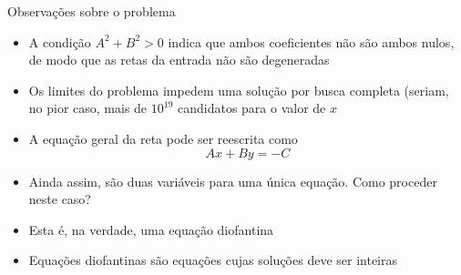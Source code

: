 \begin{frame}[fragile]{Observações sobre o problema}

    \begin{itemize}
        \item A condição $A^2 + B^2 > 0$ indica que ambos coeficientes não são ambos nulos,
            de modo que as retas da entrada não são degeneradas

        \item Os limites do problema impedem uma solução por busca completa (seriam, no pior 
            caso, mais de $10^{19}$ candidatos para o valor de $x$

        \item A equação geral da reta pode ser reescrita como
        \[
            Ax + By = -C
        \]

        \item Ainda assim, são duas variáveis para uma única equação. Como proceder neste
            caso? 

        \item Esta é, na verdade, uma equação diofantina

        \item Equações diofantinas são equações cujas soluções deve ser inteiras
    \end{itemize}

\end{frame}


